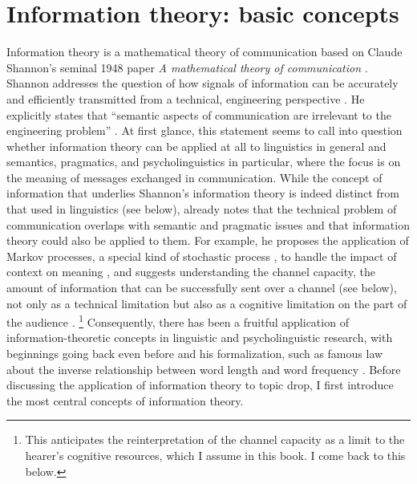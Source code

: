 \section{Information theory: basic concepts}\label{sec:infotheory.basic}
Information theory is a mathematical theory of communication based on Claude Shannon's seminal 1948 paper \textit{A mathematical theory of communication} \citep{shannon1948}.
Shannon addresses the question of how signals of information can be accurately and efficiently transmitted from a technical, engineering perspective \citep[see also][]{weaver1949}.
He explicitly states that ``semantic aspects of communication are irrelevant to the engineering problem'' \citep[379]{shannon1948}.
At first glance, this statement seems to call into question whether information theory can be applied at all to linguistics in general and semantics, pragmatics, and psycholinguistics in particular, where the focus is on the meaning of messages exchanged in communication.
While the concept of information that underlies Shannon's information theory is indeed distinct from that used in linguistics (see below), already \citet[24--28]{weaver1949} notes that the technical problem of communication overlaps with semantic and pragmatic issues and that information theory could also be applied to them.
For example, he proposes the application of Markov processes, a special kind of stochastic process \citep[385]{shannon1948}, to handle the impact of context on meaning \citep[28]{weaver1949}, and suggests understanding the channel capacity, the amount of information that can be successfully sent over a channel (see below), not only as a technical limitation but also as a cognitive limitation on the part of the audience \citep[26--27]{weaver1949}.%
\footnote{This anticipates the reinterpretation of the channel capacity  as a limit to the hearer's cognitive resources, which I assume in this book.
I come back to this below.} 
Consequently, there has been a  fruitful application of information-theoretic concepts in linguistic and psycholinguistic research, with beginnings going back even before \citet{shannon1948} and his formalization, such as  famous law about the inverse relationship between word length and word frequency \citep[see also][]{mandelbrot1965}.
Before discussing the application of information theory to topic drop, I first introduce the most central concepts of information theory.

